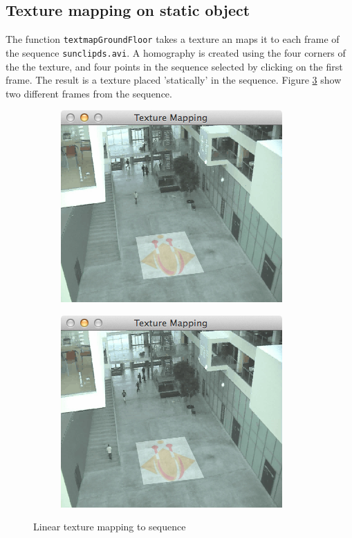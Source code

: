 \documentclass[a4paper,11pt]{article}
\begin{document}
\subsection*{Texture mapping on static object}
The function \texttt{textmapGroundFloor} takes a texture an maps it to each frame of the sequence \texttt{sunclipds.avi}. A homography is created using the four corners of the the texture, and four points in the sequence selected by clicking on the first frame. The result is a texture placed 'statically' in the sequence. Figure \ref{fig:floor} show two different frames from the sequence.

\begin{figure}[H]
\centering
\begin{subfigure}{.4\textwidth}
  \centering
  \includegraphics[width=0.8\linewidth]{groundfloor1}
  \label{fig:floor1}
\end{subfigure}
\begin{subfigure}{.4\textwidth}
  \centering
  \includegraphics[width=0.8\linewidth]{groundfloor2}
  \label{fig:floor2}
\end{subfigure}
\caption{Linear texture mapping to sequence}
\label{fig:floor}
\end{figure}
\end{document}
